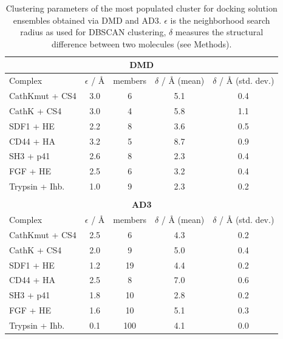 \begin{table}
\tiny
\centering
\renewcommand{\arraystretch}{1.3}
\begin{tabular}{@{}lcccc@{}}
\multicolumn{5}{c}{\textbf{DMD}} \\
\midrule
Complex & $\epsilon$ / \si{\angstrom} & members & $\delta$ / \si{\angstrom} (mean) &  $\delta$ / \si{\angstrom} (std. dev.) \\
\midrule
CathKmut + CS4 & 3.0 & 6   & 5.1 & 0.4 \\
CathK + CS4    & 3.0 & 4   & 5.8 & 1.1 \\
SDF1 + HE      & 2.2 & 8   & 3.6 & 0.5 \\
CD44 + HA      & 3.2 & 5   & 8.7 & 0.9 \\
SH3 + p41      & 2.6 & 8   & 2.3 & 0.4 \\
FGF + HE       & 2.5 & 6   & 3.2 & 0.4 \\
Trypsin + Ihb. & 1.0 & 9   & 2.3 & 0.2 \\
\midrule
& & & & \\
\multicolumn{5}{c}{\textbf{AD3}} \\
\midrule
Complex & $\epsilon$ / \si{\angstrom} & members & $\delta$ / \si{\angstrom} (mean) &  $\delta$ / \si{\angstrom} (std. dev.) \\
\midrule
CathKmut + CS4  & 2.5 & 6   & 4.3 & 0.2 \\
CathK + CS4     & 2.0 & 9   & 5.0 & 0.4 \\
SDF1 + HE       & 1.2 & 19  & 4.4 & 0.2 \\
CD44 + HA       & 2.5 & 8   & 7.0 & 0.6 \\
SH3 + p41       & 1.8 & 10  & 2.8 & 0.2 \\
FGF + HE        & 1.6 & 10  & 5.1 & 0.3 \\
Trypsin + Ihb.  & 0.1 & 100 & 4.1 & 0.0 \\
\midrule
\end{tabular}
\caption{
Clustering parameters of the most populated cluster for docking solution
ensembles obtained via DMD and AD3. $\epsilon$ is the neighborhood search radius
as used for DBSCAN clustering, $\delta$ measures the structural difference
between two molecules (see Methods).
}
\label{tab:dmd:clustering_parameters}
\end{table}


